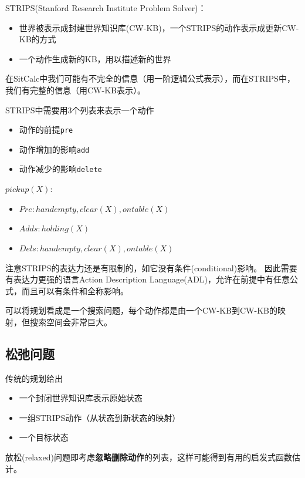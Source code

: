 STRIPS(Stanford Research Institute Problem Solver)：
\begin{itemize}
	\item 世界被表示成封建世界知识库(CW-KB)，一个STRIPS的动作表示成更新CW-KB的方式
	\item 一个动作生成新的KB，用以描述新的世界
\end{itemize}

在SitCalc中我们可能有不完全的信息（用一阶逻辑公式表示），而在STRIPS中，我们有完整的信息（用CW-KB表示）。

STRIPS中需要用3个列表来表示一个动作
\begin{itemize}
	\item 动作的前提\verb'pre'
	\item 动作增加的影响\verb'add'
	\item 动作减少的影响\verb'delete'
\end{itemize}
\begin{example}
$pickup(X)$:
\begin{itemize}
\item $Pre: {handempty, clear(X), ontable(X)}$
\item $Adds: {holding(X)}$
\item $Dels: {handempty, clear(X), ontable(X)}$
\end{itemize}
\end{example}

注意STRIPS的表达力还是有限制的，如它没有条件(conditional)影响。
因此需要有表达力更强的语言Action Description Language(ADL)，允许在前提中有任意公式，而且可以有条件和全称影响。

可以将规划看成是一个搜索问题，每个动作都是由一个CW-KB到CW-KB的映射，但搜索空间会非常巨大。

\subsection{松弛问题}
传统的规划给出
\begin{itemize}
	\item 一个封闭世界知识库表示原始状态
	\item 一组STRIPS动作（从状态到新状态的映射）
	\item 一个目标状态
\end{itemize}

放松(relaxed)问题即考虑\textbf{忽略删除动作}的列表，这样可能得到有用的启发式函数估计。

